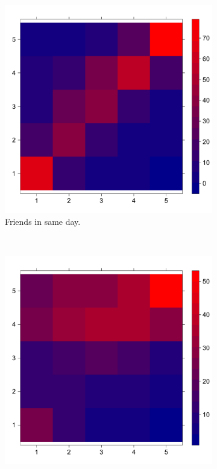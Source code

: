 \documentclass[12pt]{article}
\begin{document}
\begin{figure}[H]
  \centering
  \begin{subfigure}[b]{0.5\textwidth}
    \captionsetup{font=small}
    \includegraphics[width=\textwidth]{img/amig_eq_n}
    \caption{Friends in same day.}\label{fig:fri_eq}
  \end{subfigure}%
  ~
  \begin{subfigure}[b]{0.5\textwidth}
    \captionsetup{font=small}
    \includegraphics[width=\textwidth]{img/namig_eq_n}

\end{subfigure}
\end{figure}
\end{document}
